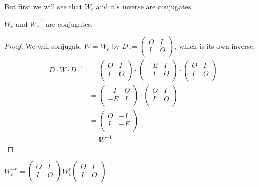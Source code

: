But first we will see that $W_{c}$ and it's inverse are conjugates.

\begin{lemma}
  $W_{c}$ and $W_{c}^{-1}$ are conjugates.
\end{lemma}

\begin{proof}
  We will conjugate $W=W_{c}$ by
  $D := \left(\begin{smallmatrix} O & I \\ I & O \\\end{smallmatrix}\right)$,
  which is its own inverse,
  \[
  \begin{aligned}
  D \cdot W \cdot D^{-1}
  & =
  \left(
  \begin{array}{cc}
    O & I \\
    I & O \\
  \end{array}
  \right)
  \cdot
  \left(
  \begin{array}{cc}
    -E & I \\
    -I & O \\
  \end{array}
  \right)
  \cdot
  \left(
  \begin{array}{cc}
    O & I \\
    I & O \\
  \end{array}
  \right) \\
  & =
  \left(
  \begin{array}{cc}
    -I & O \\
    -E & I \\
  \end{array}
  \right)
  \cdot
  \left(
  \begin{array}{cc}
    O & I \\
    I & O \\
  \end{array}
  \right) \\
  & =
  \left(
  \begin{array}{cc}
    O & -I \\
    I & -E \\
  \end{array}
  \right) \\
  & =
  W^{-1}
  \end{aligned}
  \]
\end{proof}

\begin{corollary}
  $W_{c}^{-r} =
  \left(\begin{smallmatrix} O & I \\ I & O \\\end{smallmatrix}\right)
  W_{c}^{r}
  \left(\begin{smallmatrix} O & I \\ I & O \\\end{smallmatrix}\right)$
\end{corollary}


